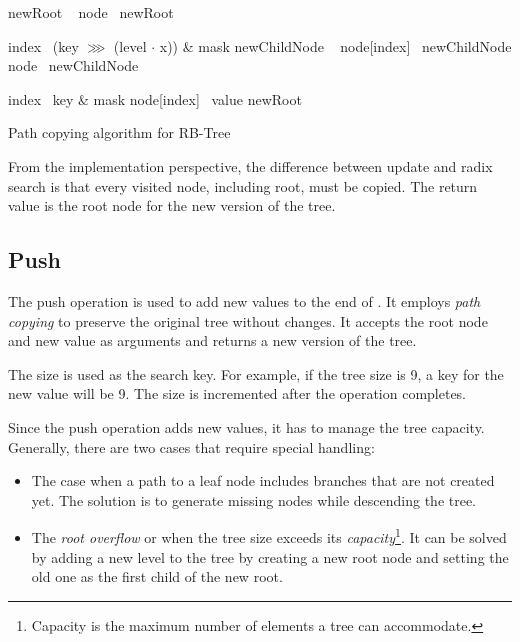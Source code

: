 \begin{listing}[ht!]
    \begin{algorithmic}[1]
            \State newRoot \la\ 
            \State node \la\ newRoot

                \State index \la\ (key $\ggg$ (level $\cdot$ x)) \& mask
                \State newChildNode \la\ 
                \State node[index] \la\ newChildNode
                \State node \la\ newChildNode
            \EndFor

            \State index \la\ key \& mask
            \State node[index] \la\ value
            \State \Return newRoot
        \EndFunction
    \end{algorithmic}

    \caption{Path copying algorithm for RB-Tree}
    \label{lst:rb-tree-update}
\end{listing}

From the implementation perspective, the difference between update and radix search is that every visited node, including root, must be copied. The return value is the root node for the new version of the tree.

\subsection{Push}
The push operation is used to add new values to the end of \treerb{}. It employs \emph{path copying} to preserve the original tree without changes. It accepts the root node and new value as arguments and returns a new version of the tree.

The \treerb{} size is used as the search key. For example, if the tree size is 9, a key for the new value will be 9. The size is incremented after the operation completes.

Since the push operation adds new values, it has to manage the tree capacity. Generally, there are two cases that require special handling:

\begin{itemize}
    \item The case when a path to a leaf node includes branches that are not created yet. The solution is to generate missing nodes while descending the tree.
    \item The \emph{root overflow} or when the tree size exceeds its \emph{capacity}\footnote{Capacity is the maximum number of elements a tree can accommodate.}. It can be solved by adding a new level to the tree by creating a new root node and setting the old one as the first child of the new root.
\end{itemize}


